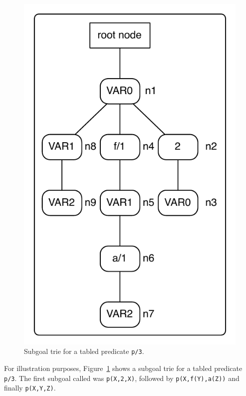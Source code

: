 \begin{figure}[ht]
  \centering
    \includegraphics[scale=0.6]{sub_call_search.pdf}
  \caption{Subgoal trie for a tabled predicate \texttt{p/3}.}
  \label{fig:sub_call_search}
\end{figure}

For illustration purposes, Figure~\ref{fig:sub_call_search} shows a subgoal trie for a tabled predicate \texttt{p/3}.
The first subgoal called was \texttt{p(X,2,X)}, followed by \texttt{p(X,f(Y),a(Z))} and finally \texttt{p(X,Y,Z)}.

